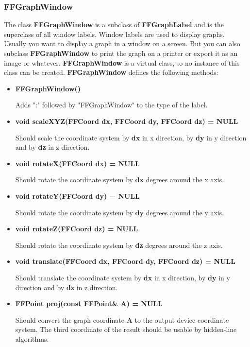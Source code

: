 \subsubsection{FFGraphWindow}
\label{ffgraphwindow}

The class {\bf FFGraphWindow} is a subclass of {\bf FFGraphLabel}
and is the superclass of all window labels. Window labels are
used to display graphs. Usually you want to display a graph in a
window on a screen. But you can also subclass {\bf FFGraphWindow}
to print the graph on a printer or export it as an image or
whatever. {\bf FFGraphWindow} is a virtual class, so no instance
of this class can be created. {\bf FFGraphWindow} defines the
following methods:

\begin{itemize}

\item{\bf FFGraphWindow()}

Adds ":" followed by "FFGraphWindow" to the type of the label.

\item{\bf void scaleXYZ(FFCoord dx, FFCoord dy, FFCoord dz) =
    NULL}
  
  Should scale the coordinate system by {\bf dx} in x direction,
  by {\bf dy} in y direction and by {\bf dz} in z direction.

\item{\bf void rotateX(FFCoord dx) = NULL}
  
  Should rotate the coordinate system by {\bf dx} degrees around
  the x axis.

\item{\bf void rotateY(FFCoord dy) = NULL}
  
  Should rotate the coordinate system by {\bf dy} degrees around
  the y axis.

\item{\bf void rotateZ(FFCoord dz) = NULL}
  
  Should rotate the coordinate system by {\bf dz} degrees around
  the z axis.

\item{\bf void translate(FFCoord dx, FFCoord dy, FFCoord dz) = NULL}
  
  Should translate the coordinate system by {\bf dx} in x
  direction, by {\bf dy} in y direction and by {\bf dz} in z
  direction.
        
\item{\bf FFPoint proj(const FFPoint\& A) = NULL}
  
  Should convert the graph coordinate {\bf A} to the output
  device coordinate system. The third coordinate of the result
  should be usable by hidden-line algorithms.


\end{itemize}
